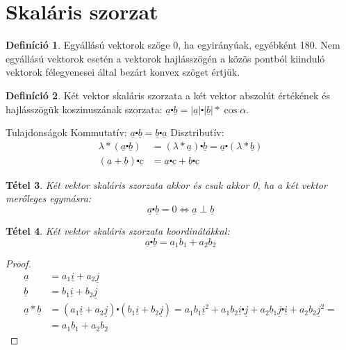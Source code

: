 \documentclass[twoside,12pt]{report}
\renewcommand{\vec}{\underline}
\newtheorem{theorem}{Tétel}[section]
\theoremstyle{definition}
\newtheorem{definition}[theorem]{Definíció}
\begin{document}
\section{Skaláris szorzat}
	\begin{definition}
		Egyállású vektorok szöge 0\degree, ha egyirányúak, egyébként 180\degree. Nem egyállású vektorok esetén a vektorok hajlásszögén a közös pontból kiinduló vektorok félegyenesei által bezárt konvex szöget értjük.
	\end{definition}
	\begin{definition}
		Két vektor skaláris szorzata a két vektor abszolút értékének és hajlásszögük koszinuszának szorzata: $\vec{a}\centerdot\vec{b}=|\vec{a}|\centerdot|\vec{b}|*\cos\alpha$.
	\end{definition}
	\begin{outline}
		\1 Tulajdonságok
			\2 Kommutatív: $\vec{a}\centerdot\vec{b}=\vec{b}\centerdot\vec{a}$
			\2 Disztributív:
			\begin{align*}
				\lambda*(\vec{a}\centerdot\vec{b})&=(\lambda*\vec{a})\centerdot\vec{b}=\vec{a}\centerdot(\lambda*\vec{b})\\
				(\vec{a}+\vec{b})\centerdot\vec{c}&=\vec{a}\centerdot\vec{c}+\vec{b}\centerdot\vec{c}
			\end{align*}
	\end{outline}
	\begin{theorem}
		Két vektor skaláris szorzata akkor és csak akkor 0, ha a két vektor merőleges egymásra:
		\begin{equation*}
			\vec{a}\centerdot\vec{b}=0\Leftrightarrow\vec{a}\perp\vec{b}
		\end{equation*}
	\end{theorem}
	\begin{theorem}
		Két vektor skaláris szorzata koordinátákkal:
		\begin{equation*}
			\vec{a}\centerdot\vec{b}=a_1b_1+a_2b_2
		\end{equation*}
	\end{theorem}
	\begin{proof}
		\begin{align*}
			\vec{a}&=a_1\vec{i}+a_2\vec{j}\\
			\vec{b}&=b_1\vec{i}+b_2\vec{j}\\
			\vec{a}*\vec{b}&=(a_1\vec{i}+a_2\vec{j})\centerdot(b_1\vec{i}+b_2\vec{j})=a_1b_1\vec{i}^2+a_1b_2\vec{i}\centerdot\vec{j}+a_2b_1\vec{j}\centerdot\vec{i}+a_2b_2\vec{j}^2=\\
			&=a_1b_1+a_2b_2
		\end{align*}
	\end{proof}
\end{document}
